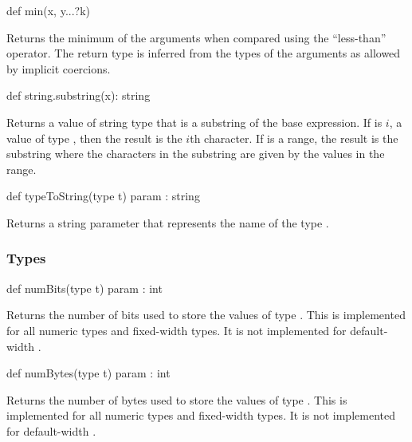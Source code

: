 \begin{protohead}
def min(x, y...?k)
\end{protohead}
\begin{protobody}
Returns the minimum of the arguments when compared using the
``less-than'' operator.  The return type is inferred from the types of
the arguments as allowed by implicit coercions.
\end{protobody}

\begin{protohead}
def string.substring(x): string
\end{protohead}
\begin{protobody}
Returns a value of string type that is a substring of the base
expression.  If  is $i$, a value of type , then the
result is the $i$th character.  If  is a range, the result is
the substring where the characters in the substring are given by the
values in the range.
\end{protobody}

\begin{protohead}
def typeToString(type t) param : string
\end{protohead}
\begin{protobody}
Returns a string parameter that represents the name of the
type .
\end{protobody}

\subsubsection{Types}

\begin{protohead}
def numBits(type t) param : int
\end{protohead}
\begin{protobody}
Returns the number of bits used to store the values of type .
This is implemented for all numeric types and fixed-width  types.
It is not implemented for default-width .
\end{protobody}


\begin{protohead}
def numBytes(type t) param : int
\end{protohead}
\begin{protobody}
Returns the number of bytes used to store the values of type .
This is implemented for all numeric types and fixed-width  types.
It is not implemented for default-width .
\end{protobody}

